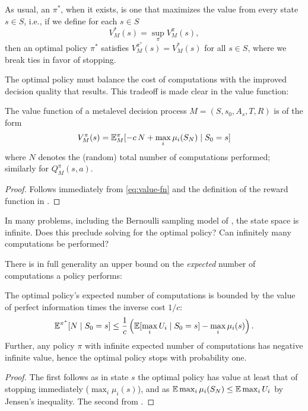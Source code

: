 As usual, an  $\pi^*$, when it exists, is one that maximizes 
the value from every state $s\in S$, i.e., if we define for each $s\in S$
\[
	V^*_M(s)   = \sup_\pi V^\pi_M(s),
\]
then an optimal policy $\pi^*$ satisfies $V^{\pi^*}_M(s) = V^*_M(s)$
for all $s\in S$, where we break ties in favor of stopping.

The optimal policy must balance the cost of computations with the improved decision
quality that results.  This tradeoff is made clear in the value function:

\begin{thm}\label{thm:value-of-computation}
	The value function of a metalevel decision process $M=(S,s_0,A_s,T,R)$ is of the form
	\[
		V^\pi_M(s) = \mathbb{E}^\pi_M[ -c\,N + \max_i \mu_i(S_N) \mid S_0=s]
	\]
	where $N$ denotes the (random) total number of computations performed;
	similarly for $Q^\pi_M(s,a)$.
\end{thm}

\begin{proof}
	Follows immediately from \eqref{eq:value-fn} and the definition of the
	reward function in .
\end{proof}

In many problems, including the Bernoulli sampling model of ,
the state space is infinite.  Does this preclude solving for the optimal policy?  Can 
infinitely many computations be performed?

There is in full generality an upper bound on the \emph{expected} number of computations
a policy performs:

\begin{thm}\label{thm:bounded-expected-computations}
	The optimal policy's expected number of computations is bounded by the 
	value of perfect information \citep{Howard:1966} times the inverse cost $1/c$:
	\[
		\mathbb{E}^{\pi^*}[N\mid S_0=s] \le \frac{1}{c} \left(\mathbb{E}[\max_i U_i\mid S_0=s] - \max_i \mu_i(s)\right).
	\]
	Further, any policy $\pi$ with infinite expected number of computations 
	has negative infinite value, hence the optimal
	policy stops with probability one.
\end{thm}

\begin{proof}
	The first follows as in state $s$ the optimal policy has value at least that
	of stopping immediately ($\max_i \mu_i(s)$), and as $\mathbb{E} \max_i\mu_i(S_N) \le \mathbb{E} \max_i U_i$ by Jensen's inequality.
	The second from .
\end{proof}

